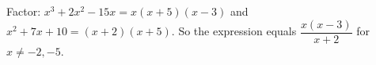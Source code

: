 Factor: $x^3+2x^2-15x=x(x+5)(x-3)$ and $x^2+7x+10=(x+2)(x+5)$. So the expression equals $\boxed{\dfrac{x(x-3)}{x+2}}$ for $x\ne-2,-5$.
